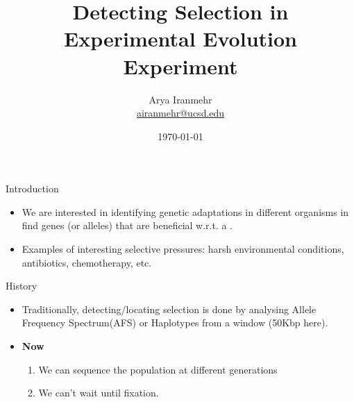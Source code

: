 \documentclass[t]{beamer} %
\title{Detecting Selection in Experimental Evolution Experiment}
\subtitle{}
\author[Arya Iranmehr]
{%
  \texorpdfstring{
      \centering
      Arya Iranmehr\\
      \href{mailto:airanmehr@ucsd.edu}{airanmehr@ucsd.edu}
  }
  {Arya Iranmehr}
}
\institute{
Bafna Lab\\
University of California, San Diego}
\date{
\monthyeardate\today}
\begin{document}
\begin{frame}
  \titlepage
\end{frame}


\begin{frame}{Introduction}
\begin{itemize}
\item We are interested in identifying genetic adaptations in different organisms in find genes (or alleles) that are beneficial w.r.t. a  .
\item Examples of interesting selective pressures: harsh environmental conditions, antibiotics, chemotherapy, etc.
\end{itemize}
\end{frame}



\begin{frame}{History}
\begin{itemize}
\item Traditionally, detecting/locating selection is done by analysing Allele Frequency Spectrum(AFS) or Haplotypes from a window (50Kbp here).
\item {\bf Now}
\begin{enumerate}
\item We can sequence the population at different generations
\item We can't wait until fixation. 
\end{enumerate}
\end{itemize}
\end{frame}
\end{document}

